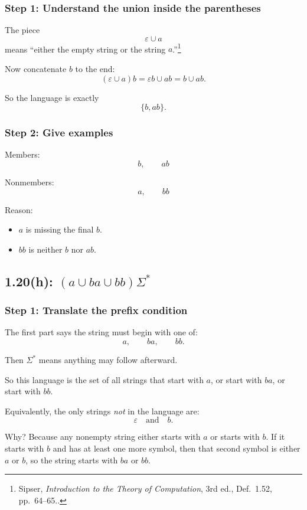 \documentclass[12pt]{article}
\newcommand{\sipser}[1]{\footnote{Sipser, \emph{Introduction to the Theory of Computation}, 3rd ed., #1.}}
\begin{document}
\subsubsection*{Step 1: Understand the union inside the parentheses}

The piece
\[
\varepsilon \cup a
\]
means ``either the empty string or the string \(a\).''\sipser{Def.~1.52, pp.~64--65.}

Now concatenate \(b\) to the end:
\[
(\varepsilon \cup a)b = \varepsilon b \cup ab = b \cup ab.
\]

So the language is exactly
\[
\{b,ab\}.
\]

\subsubsection*{Step 2: Give examples}

Members:
\[
b,\qquad ab
\]

Nonmembers:
\[
a,\qquad bb
\]

Reason:
\begin{itemize}[itemsep=0.3em]
    \item \(a\) is missing the final \(b\).
    \item \(bb\) is neither \(b\) nor \(ab\).
\end{itemize}

\subsection*{1.20(h): \((a \cup ba \cup bb)\Sigma^*\)}

\subsubsection*{Step 1: Translate the prefix condition}

The first part says the string must begin with one of:
\[
a,\qquad ba,\qquad bb.
\]

Then \(\Sigma^*\) means anything may follow afterward.

So this language is the set of all strings that start with \(a\), or start with \(ba\), or start with \(bb\).

Equivalently, the only strings \emph{not} in the language are:
\[
\varepsilon \quad \text{and} \quad b.
\]

Why? Because any nonempty string either starts with \(a\) or starts with \(b\). If it starts with \(b\) and has at least one more symbol, then that second symbol is either \(a\) or \(b\), so the string starts with \(ba\) or \(bb\).
\end{document}
